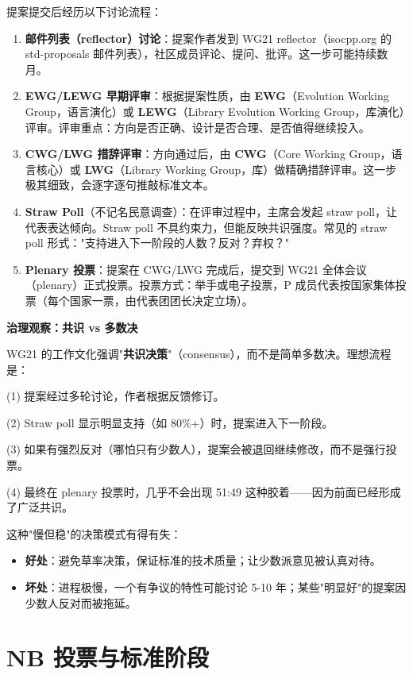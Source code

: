 \documentclass[12pt,a4paper,fontset=fandol]{ctexbook}
\begin{document}
提案提交后经历以下讨论流程：

\begin{enumerate}
  \item \textbf{邮件列表（reflector）讨论}：提案作者发到 WG21 reflector（isocpp.org 的 std-proposals 邮件列表），社区成员评论、提问、批评。这一步可能持续数月。
  \item \textbf{EWG/LEWG 早期评审}：根据提案性质，由 \textbf{EWG}（Evolution Working Group，语言演化）或 \textbf{LEWG}（Library Evolution Working Group，库演化）评审。评审重点：方向是否正确、设计是否合理、是否值得继续投入。
  \item \textbf{CWG/LWG 措辞评审}：方向通过后，由 \textbf{CWG}（Core Working Group，语言核心）或 \textbf{LWG}（Library Working Group，库）做精确措辞评审。这一步极其细致，会逐字逐句推敲标准文本。
  \item \textbf{Straw Poll}（不记名民意调查）：在评审过程中，主席会发起 straw poll，让代表表达倾向。Straw poll 不具约束力，但能反映共识强度。常见的 straw poll 形式："支持进入下一阶段的人数？反对？弃权？"
  \item \textbf{Plenary 投票}：提案在 CWG/LWG 完成后，提交到 WG21 全体会议（plenary）正式投票。投票方式：举手或电子投票，P 成员代表按国家集体投票（每个国家一票，由代表团团长决定立场）。
\end{enumerate}

\begin{govbox}
\textbf{治理观察：共识 vs 多数决}

WG21 的工作文化强调"\textbf{共识决策}"（consensus），而不是简单多数决。理想流程是：

(1) 提案经过多轮讨论，作者根据反馈修订。

(2) Straw poll 显示明显支持（如 80\%+）时，提案进入下一阶段。

(3) 如果有强烈反对（哪怕只有少数人），提案会被退回继续修改，而不是强行投票。

(4) 最终在 plenary 投票时，几乎不会出现 51:49 这种胶着——因为前面已经形成了广泛共识。

这种"慢但稳"的决策模式有得有失：
\begin{itemize}
  \item \textbf{好处}：避免草率决策，保证标准的技术质量；让少数派意见被认真对待。
  \item \textbf{坏处}：进程极慢，一个有争议的特性可能讨论 5-10 年；某些"明显好"的提案因少数人反对而被拖延。
\end{itemize}
\end{govbox}

\section{NB 投票与标准阶段}
\end{document}
